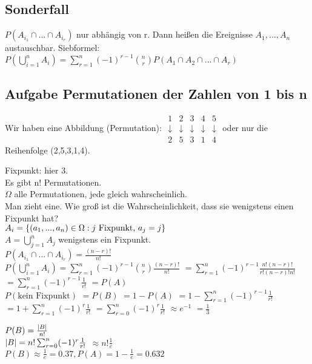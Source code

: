 \subsection{Sonderfall}
$P(A_{i_1}\cap ... \cap A_{i_r})$ nur abhängig von r. Dann heißen die Ereignisse $A_1, ..., A_n$ austauschbar. Siebformel: 
$P(\bigcup_{i=1}^n A_i) = \sum_{r=1}^{n} (-1)^{r-1} \binom n r P(A_1 \cap A_2 \cap ... \cap A_r)$

\subsection{Aufgabe Permutationen der Zahlen von 1 bis n}
Wir haben eine Abbildung (Permutation): $ \begin{array}{ccccc}
1 & 2 & 3 & 4 & 5 \\ 
\downarrow & \downarrow & \downarrow & \downarrow & \downarrow \\ 
2 & 5 & 3 & 1 & 4
\end{array} $ 
oder nur die Reihenfolge (2,5,3,1,4).

Fixpunkt: hier 3. \\
Es gibt n! Permutationen.\\
$\Omega$ alle Permutationen, jede gleich wahrscheinlich. \\
Man zieht eine. Wie groß ist die Wahrscheinlichkeit, dass sie wenigstens einen Fixpunkt hat?\\
$A_i =  \left\lbrace (a_1,...,a_n) \in \Omega : j \textrm{ Fixpunkt, } a_j=j \right\rbrace $\\
$A = \bigcup_{j=1}^n A_j$ wenigstens ein Fixpunkt. \\
$P(A_{i_1} \cap ... \cap A_{i_r}) = \frac{(n-r)!}{n!}$\\
$P(\bigcup_{i=1}^n A_i) = \sum_{r=1}^{n} (-1)^{r-1} \binom n r \frac{(n-r)!}{n!}$
$= \sum_{r=1}^{n} (-1)^{r-1} \frac{n! (n-r)!}{r! (n-r)! n!}$
$= \sum_{r=1}^{n} (-1)^{r-1} \frac{1}{r!}$
$= P(A)$\\

$P(\textrm{kein Fixpunkt}) $
$=P(B)$
$=1 - P(A)$
$=1 - \sum_{r=1}^{n} (-1)^{r-1} \frac{1}{r!}$
$=1 + \sum_{r=1}^{n} (-1)^{r} \frac{1}{r!}$
$=\sum_{r=0}^{n} (-1)^{r} \frac{1}{r!}$
$\approx e^{-1}$
$= \frac{1}{3}$ 

$P(B) = \frac{ \left\vert B \right\vert }{n!}$\\
$ \left\vert B \right\vert  = n! \sum_{r=0}^{n} (-1)^r \frac{1}{r!} $
$\approx n! \frac{1}{e}$\\
$P(B) \approx \frac{1}{e} = 0.37, P(A)=1-\frac{1}{e} = 0.632$

